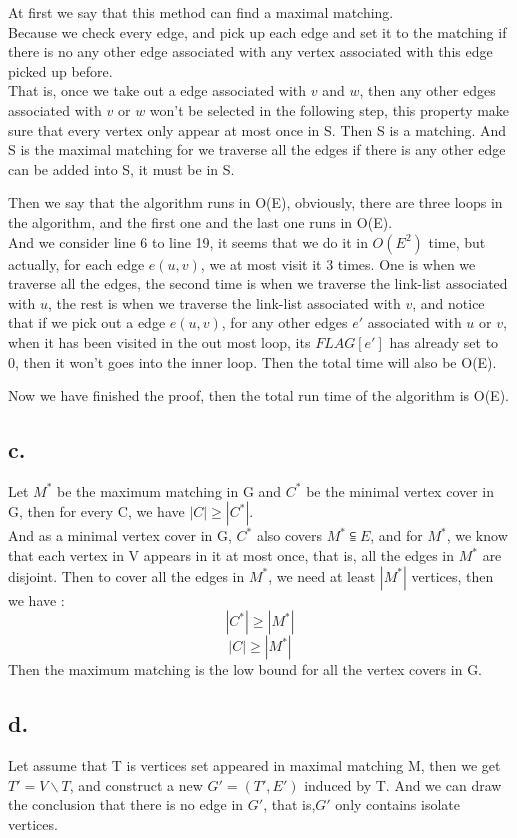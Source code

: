 \documentclass[oneside]{homework} %
\begin{document}
\noindent At first we say that this method can find a maximal matching.\\ 
Because we check every edge, and pick up each edge and set it to the matching if there is no any other edge associated with any vertex associated with this edge picked up before. \\ That is, once we take out a edge associated with $v$ and $w$, then any other edges associated with $v$ or $w$ won't be selected in the following step, this property make sure that every vertex only appear at most once in S. Then S is a matching. And S is the maximal matching for we traverse all the edges if there is any other edge can be added into S, it must be in S.

Then we say that the algorithm runs in O(E), obviously, there are three loops in the algorithm, and the first one and the last one runs in O(E).\\ 
And we consider line 6 to line 19, it seems that we do it  in $O(E^{2})$ time, but actually, for each edge $e(u,v)$, we at most visit it 3 times. One is when we traverse all the edges, the second time is when  we traverse the link-list associated with $u$, the rest is when we traverse the link-list associated with $v$, and notice that if we pick out a edge $e(u,v)$, for any other edges $e'$ associated with $u$ or $v$, when it has been visited in the out most loop, its $FLAG[e']$ has already set to 0, then it won't goes into the inner loop. Then the total time will also be O(E).

Now we have finished the proof, then the total run time of the algorithm is O(E).

\subsection*{c.}
Let $M^{*}$ be the maximum matching in G and $C^{*}$ be the minimal vertex cover in G, then for every C, we have $|C| \geq |C^{*}|$. \\
And as a minimal vertex cover in G, $C^{*}$ also covers $M^{*} \subseteqq E$, and for $M^{*}$, we know that each vertex in V appears in it at most once, that is, all the edges in $M^{*}$ are disjoint. Then to cover all the edges in $M^{*}$, we need at least $|M^{*}|$ vertices, then we have :
$$ |C^{*}| \geq |M^{*}| $$
$$ |C| \geq |M^{*}| $$
Then the maximum matching is the low bound for all the vertex covers in G.

\subsection*{d.}
Let assume that T is vertices set appeared in maximal matching M, then we get $T' = V\backslash T$, and construct a new $G' = (T',E')$ induced by T. And we can draw the conclusion that there is no edge in $G'$, that is,$G'$ only contains isolate vertices. 
\end{document}
